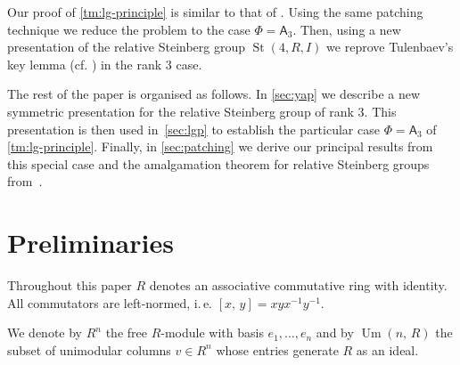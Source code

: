 \documentclass[11pt]{amsart}
\theoremstyle{plain} \declaretheorem[name=Theorem, Refname={Theorem,Theorems}]{tm} \Crefname{tm}{Theorem}{Theorems}
\numberwithin{equation}{section}
\theoremstyle{definition} \newtheorem{df}[lm]{Definition} \Crefname{df}{Definition}{Definitions}
\theoremstyle{remark} \newtheorem{rk}[lm]{Remark} \Crefname{rk}{Remark}{Remarks}
\newcommand{\Um}{\mathop{\mathrm{Um}}\nolimits}
\newcommand{\St}{\mathop{\mathrm{St}}\nolimits}
\newcommand{\SL}{\mathop{\mathrm{SL}}\nolimits}
\newcommand{\inv}{^{-1}}
\newcommand{\rA}{\mathsf{A}}
\begin{document}
Our proof of \cref{tm:lg-principle} is similar to that of \cite[Theorem~1]{SCh}.
Using the same patching technique we reduce the problem to the case $\Phi=\rA_3$.
Then, using a new presentation of the relative Steinberg group $\St(4, R, I)$ we reprove Tulenbaev's key lemma (cf. \cite[Lemma~2.3]{Tul}) in the rank $3$ case.

The rest of the paper is organised as follows. 
In \cref{sec:yap} we describe a new symmetric presentation for the relative Steinberg group of rank $3$.
This presentation is then used in~\cref{sec:lgp} to establish the particular case $\Phi=\rA_3$ of \cref{tm:lg-principle}.
Finally, in \cref{sec:patching} we derive our principal results from this special case and the amalgamation theorem for relative Steinberg groups from~\cite{SCh}.

\section{Preliminaries} \label{sec:prelim}
Throughout this paper $R$ denotes an associative commutative ring with identity.
All commutators are left-normed, i.\,e. $[x,\,y]=xyx\inv y\inv$. 




We denote by $R^n$ the free $R$-module with basis $e_1,\ldots,e_n$ and by $\Um(n,\,R)$ the subset of unimodular columns $v\in R^n$ 
whose entries generate $R$ as an ideal.
\end{document}
